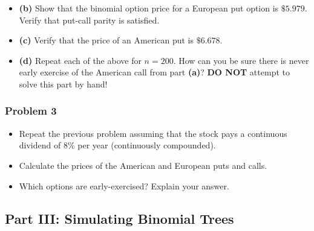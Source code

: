 \documentclass[
]{article}
\newenvironment{Shaded}{\begin{snugshade}}{\end{snugshade}}
\providecommand{\tightlist}{%
  \setlength{\itemsep}{0pt}\setlength{\parskip}{0pt}}
\begin{document}
\begin{itemize}
\tightlist
\item
  \textbf{(b)} Show that the binomial option price for a European put
  option is \(\$5.979\). Verify that put-call parity is satisfied.
\end{itemize}

\begin{itemize}
\tightlist
\item
  \textbf{(c)} Verify that the price of an American put is \(\$6.678\).
\end{itemize}

\begin{itemize}
\tightlist
\item
  \textbf{(d)} Repeat each of the above for \(n = 200\). How can you be
  sure there is never early exercise of the American call from part
  \textbf{(a)}? \textbf{DO NOT} attempt to solve this part by hand!
\end{itemize}

\hypertarget{problem-3}{%
\subsubsection{\texorpdfstring{\textbf{Problem
3}}{Problem 3}}\label{problem-3}}

\begin{itemize}
\tightlist
\item
  Repeat the previous problem assuming that the stock pays a continuous
  dividend of \(8\%\) per year (continuously compounded).
\item
  Calculate the prices of the American and European puts and calls.
\item
  Which options are early-exercised? Explain your answer.
\end{itemize}

\begin{Shaded}
\begin{Highlighting}[]

\end{Highlighting}
\end{Shaded}

\hypertarget{part-iii-simulating-binomial-trees}{%
\subsection{\texorpdfstring{\textbf{Part III: Simulating Binomial
Trees}}{Part III: Simulating Binomial Trees}}\label{part-iii-simulating-binomial-trees}}
\end{document}
